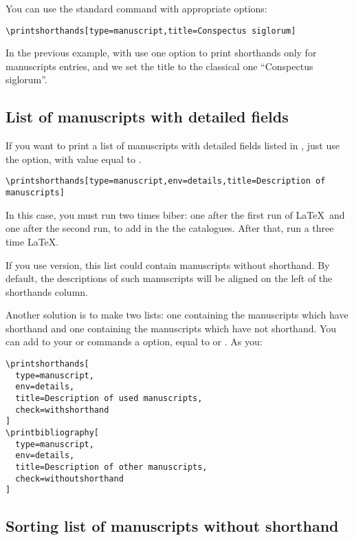 \documentclass{ltxdockit}[2011/03/25]
\begin{document}
You can use the standard command  with appropriate options:

\begin{verbatim}
\printshorthands[type=manuscript,title=Conspectus siglorum]
\end{verbatim}

In the previous example, with use one option to print shorthands only for manuscripts entries, and we set the title to the classical one \enquote{Conspectus siglorum}.

\subsection{List of manuscripts with detailed fields}

If you want to print a list of manuscripts with detailed fields listed in , just use the  option, with value equal to
.

\begin{verbatim}
\printshorthands[type=manuscript,env=details,title=Description of manuscripts]
\end{verbatim}

In this case, you must run two times biber: one after the first run of \LaTeX\ and one after the second run, to add in the  the catalogues. After that, run a three time \LaTeX.

If you use  version, this list could contain manuscripts without shorthand. By default, the descriptions of such manuscripts will be aligned on the left of the shorthands column. 

\label{bibcheck}Another solution is to make two lists: one containing the manuscripts which have shorthand and one containing the manuscripts which have not shorthand. You can add to your  or   commands a  option, equal to  or . As you:
\begin{verbatim}
\printshorthands[
  type=manuscript,
  env=details,
  title=Description of used manuscripts,
  check=withshorthand
]
\printbibliography[
  type=manuscript,
  env=details,
  title=Description of other manuscripts,
  check=withoutshorthand
]
\end{verbatim}

\subsection{Sorting list of manuscripts without shorthand}
\end{document}
